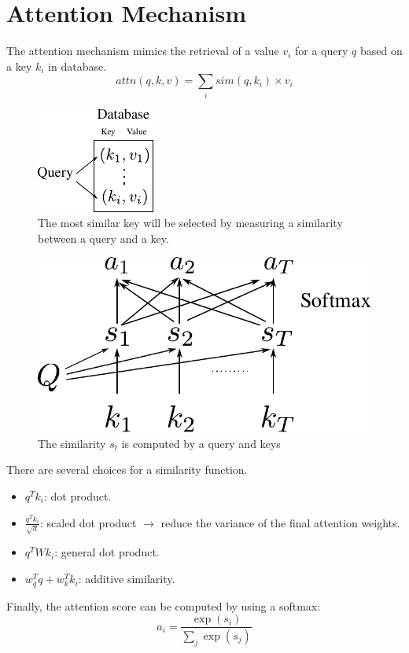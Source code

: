 \section{Attention Mechanism}
\label{sec:nlp_attention}
The attention mechanism mimics the retrieval of a value $v_i$ for a query $q$ based on a key $k_i$ in database.
$$attn(q, k, v) = \sum_i sim(q,k_i)\times v_i$$
\begin{figure}[h]
	\centering
	\includegraphics[scale=2.0]{./images/transformer/attention_database.pdf}
	\caption{The most similar key will be selected by measuring a similarity between a query and a key.}
\end{figure}

\begin{figure}[h]
	\centering
	\includegraphics[scale=0.8]{./images/transformer/attention.pdf}
	\caption{The similarity $s_t$ is computed by a query and keys}
\end{figure}
There are several choices for a similarity function.
\begin{itemize}
	\item $q^Tk_i$: dot product.
	\item $\frac{q^Tk_i}{\sqrt{d}}$: scaled dot product $\to$ reduce the variance of the final attention weights. 
	\item $q^TWk_i$: general dot product.
	\item $w_q^Tq+ w_k^Tk_i$: additive similarity.
\end{itemize}
Finally, the attention score can be computed by using a softmax:
$$a_i = \frac{\exp(s_i)}{\sum_j \exp(s_j)}$$

